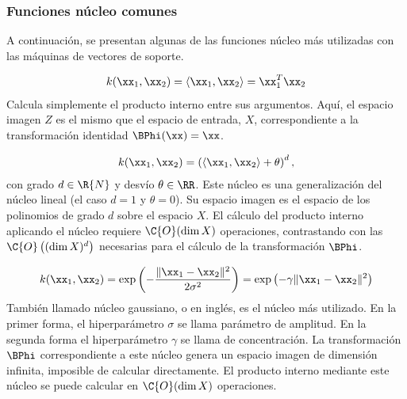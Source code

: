 %
\subsubsection{Funciones núcleo comunes}
%
A continuación, se presentan algunas de las funciones núcleo más
utilizadas con las máquinas de vectores de soporte.
%
\begin{description}[font=\relscale{0.9}]
%
\item[Núcleo lineal]
  \begin{align}
    k(\xx_1,\xx_2)=\langle \xx_1, \xx_2\rangle=\xx_1^T\xx_2
  \end{align}
  Calcula simplemente el producto interno entre sus argumentos.
  Aquí, el espacio imagen $Z$ es el mismo que el espacio de entrada,
  $X$, correspondiente a la transformación identidad $\BPhi(\xx)=\xx$.
%
\item[Núcleo polinómico]
  \begin{align}
    k(\xx_1,\xx_2)=\left(\langle{}\xx_1,\xx_2\rangle+\theta\right)^d,
  \end{align}
  con grado $d\in\R{N}$ y desvío $\theta\in\RR$.
  Este núcleo es una generalización del núcleo lineal (el caso $d=1$ y
  $\theta=0$).
  Su espacio imagen es el espacio de los polinomios de grado $d$ sobre
  el espacio $X$.
  El cálculo del producto interno aplicando el núcleo requiere
  $\C{O}(\dim{}X)$ operaciones, contrastando con las
  $\C{O}\left((\dim{}X)^d\right)$ necesarias para el cálculo de la
  transformación $\BPhi$.
%
\item[Función de base radial (RBF)]
  \begin{align}
    k(\xx_1,\xx_2)=\exp\left(-\frac{\|\xx_1-\xx_2\|^2}{2\sigma^2}\right)
    =\exp\left(-\gamma\|\xx_1-\xx_2\|^2\right)
  \end{align}
  También llamado núcleo gaussiano, o  en
  inglés, es el núcleo más utilizado.
  En la primer forma, el hiperparámetro $\sigma$ se llama parámetro de
  amplitud.
  En la segunda forma el hiperparámetro $\gamma$ se llama de
  concentración.
  La transformación $\BPhi$ correspondiente a este núcleo genera un
  espacio imagen de dimensión infinita, imposible de calcular
  directamente.
  El producto interno mediante este núcleo se puede calcular en
  $\C{O}(\dim{}X)$ operaciones.
\end{description}
%

